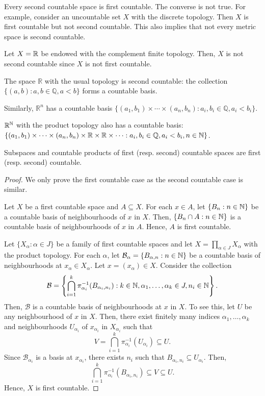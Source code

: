 \begin{example}
    Every second countable space is first countable. The converse is not true. For example, consider an uncountable set $X$ with the discrete topology. Then $X$ is first countable but not second countable. This also implies that not every metric space is second countable.
\end{example}

\begin{example}
    Let $X=\mathbb{R}$ be endowed with the complement finite topology. Then, $X$ is not second countable since $X$ is not first countable.
\end{example}


\begin{example}
    The space $\mathbb{R}$ with the usual topology is second countable: the collection $\{(a,b):a,b\in\mathbb{Q}, a<b\}$ forms a countable basis.

    Similarly, $\mathbb{R}^n$ has a countable basis $\{(a_1,b_1)\times\cdots\times(a_n,b_n):a_i,b_i\in\mathbb{Q}, a_i<b_i\}$.

    $\mathbb{R}^{\mathbb{N}}$ with the product topology also has a countable basis: $\{ (a_1,b_1)\times\cdots\times(a_n,b_n)\times\mathbb{R}\times\mathbb{R}\times\cdots : a_i,b_i\in\mathbb{Q}, a_i<b_i, n\in\mathbb{N} \}$.
\end{example}

\newpage


\begin{theorem}
    Subspaces and countable products of first (resp. second) countable spaces are first (resp. second) countable.
\end{theorem}
\begin{proof}
    We only prove the first countable case as the second countable case is similar.

    Let $X$ be a first countable space and $A\subseteq X$. For each $x\in A$, let $\{B_n:n\in\mathbb{N}\}$ be a countable basis of neighbourhoods of $x$ in $X$. Then, $\{B_n\cap A:n\in\mathbb{N}\}$ is a countable basis of neighbourhoods of $x$ in $A$. Hence, $A$ is first countable.

    Let $\{X_\alpha:\alpha\in J\}$ be a family of first countable spaces and let $X=\prod_{\alpha\in J} X_\alpha$ with the product topology. For each $\alpha$, let $\mathcal{B}_\alpha=\{B_{\alpha,n}:n\in\mathbb{N}\}$ be a countable basis of neighbourhoods at $x_\alpha\in X_\alpha$. Let $x=(x_\alpha)\in X$. Consider the collection
    $$\mathcal{B}=\left\{\bigcap_{i=1}^k \pi_{\alpha_i}^{-1}(B_{\alpha_i,n_i}): k\in\mathbb{N}, \alpha_1,\ldots,\alpha_k\in J, n_i\in\mathbb{N} \right\}.$$
    Then, $\mathcal{B}$ is a countable basis of neighbourhoods at $x$ in $X$. To see this, let $U$ be any neighbourhood of $x$ in $X$. Then, there exist finitely many indices $\alpha_1,\ldots,\alpha_k$ and neighbourhoods $U_{\alpha_i}$ of $x_{\alpha_i}$ in $X_{\alpha_i}$ such that 
    $$V=\bigcap_{i=1}^k \pi_{\alpha_i}^{-1}(U_{\alpha_i})\subseteq U.$$
    Since $\mathcal{B}_{\alpha_i}$ is a basis at $x_{\alpha_i}$, there exists $n_i$ such that $B_{\alpha_i,n_i}\subseteq U_{\alpha_i}$. Then,
    $$\bigcap_{i=1}^k \pi_{\alpha_i}^{-1}(B_{\alpha_i,n_i}) \subseteq V \subseteq U.$$ Hence, $X$ is first countable.
\end{proof}

